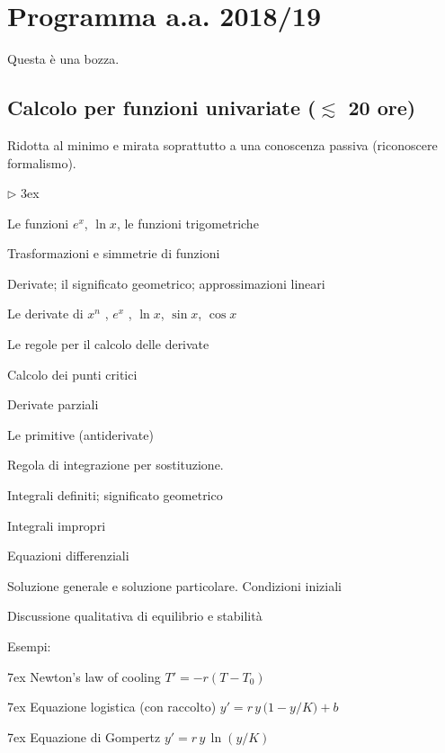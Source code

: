 \documentclass[10pt]{article}
\newcommand{\mylabel}[1]{#1\hfill}
\renewenvironment{itemize}
  {\begin{list}{$\triangleright$}{%
   \baselineskip3ex
   \setlength{\parskip}{4mm}
   \setlength{\topsep}{.4\baselineskip}
   \setlength{\rightmargin}{0mm}
   \setlength{\listparindent}{0mm}
   \setlength{\itemindent}{0mm}
   \setlength{\labelwidth}{2ex}
   \setlength{\itemsep}{.4\baselineskip}
   \setlength{\parsep}{0mm}
   \setlength{\partopsep}{0mm}
   \setlength{\labelsep}{1ex}
   \setlength{\leftmargin}{\labelwidth+\labelsep}
   \let\makelabel\mylabel}}{%
   \end{list}\vspace*{-1.3mm}}
\begin{document}
\section{Programma a.a. 2018/19}

Questa è una bozza.


\subsection{Calcolo per funzioni univariate (\boldmath$\lesssim$ 20 ore)}

\colorbox{blue!10}{\begin{minipage}{\textwidth}
Ridotta al minimo e mirata soprattutto a una conoscenza passiva (riconoscere formalismo). 
\end{minipage}}



\begin{itemize}
\item Le funzioni $e^x$, $\ln x$, le funzioni trigometriche

\item Trasformazioni e simmetrie di funzioni

\item Derivate; il significato geometrico; approssimazioni lineari

      Le derivate di $x^n$ , $e^x$ , $\ln x$, $\sin x$, $\cos x$\hfill{}

      Le regole per il calcolo delle derivate\hfill{}
      
      Calcolo dei punti critici

      Derivate parziali\hfill{}
      
\item Le primitive (antiderivate)

Regola di integrazione per sostituzione.\hfill{}

Integrali definiti; significato geometrico

Integrali impropri

\item Equazioni differenziali \hfill{}

  Soluzione generale e soluzione particolare. Condizioni iniziali
  
  Discussione qualitativa di equilibrio e stabilità
  
  Esempi:\hfill{} 
  
  \noindent\kern7ex Newton's law of cooling $T' = -r(T-T_0)$
  
  \noindent\kern7ex Equazione logistica (con raccolto) $y' = r\, y\,\big(1- y/K\big) + b$
  
  \noindent\kern7ex Equazione di Gompertz $y' = r\, y\,\ln(y/K)$
\end{itemize}
\end{document}
